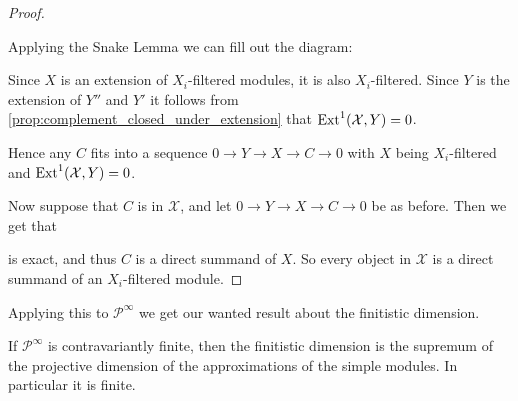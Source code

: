 \begin{theorem}
\begin{proof}
\begin{center}
		\end{center}
		Applying the Snake Lemma we can fill out the diagram:
		\begin{center}
		\end{center}
		Since $X$ is an extension of $X_i$-filtered modules, it is also $X_i$-filtered. Since $Y$ is the extension of $Y''$ and $Y'$ it follows from \cref{prop:complement_closed_under_extension} that $\operatorname{Ext}^1(\mathcal X, Y)=0$.
		
		Hence any $C$ fits into a sequence $0 \to Y \to X \to C \to 0$ with $X$ being $X_i$-filtered and $\operatorname{Ext}^{1}(\mathcal X, Y)=0$.
		
		Now suppose that $C$ is in $\mathcal X$, and let $0 \to Y \to X \to C \to 0$ be as before. Then we get that
		\begin{center}
		\end{center}
		is exact, and thus $C$ is a direct summand of $X$. So every object in $\mathcal X$ is a direct summand of an $X_i$-filtered module.
	\end{proof}
\end{theorem}

Applying this to $\mathcal P^\infty$ we get our wanted result about the finitistic dimension.

\begin{cor}\label{cor:contravariant_finite_implies_FDC}
	If $\mathcal P^\infty$ is contravariantly finite, then the finitistic dimension is the supremum of the projective dimension of the approximations of the simple modules. In particular it is finite.
\end{cor}

